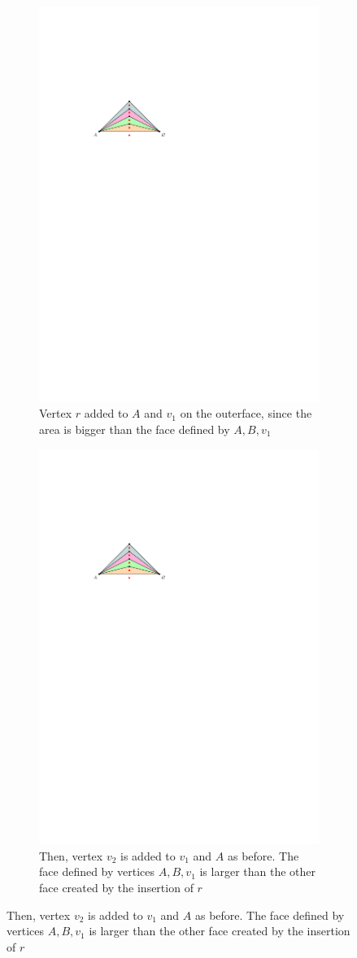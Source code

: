 \begin{figure}[H]
	\centering
	\begin{subfigure}{0.7\textwidth}
		\centering
		\includegraphics[width=.7\linewidth,page=15]{drawings/k-trees.pdf}
		\caption{Vertex $r$ added to $A$ and $v_1$ on the outerface, since the area is bigger than the face defined by $A,B,v_1$}
	\end{subfigure}
\begin{subfigure}{0.7\textwidth}
	\centering
	\includegraphics[width=.7\linewidth,page=16]{drawings/k-trees.pdf}
	\caption{Then, vertex $v_2$ is added to $v_1$ and $A$ as before. The face defined by vertices $A,B,v_1$ is larger than the other face created by the insertion of $r$}
\end{subfigure}


\end{figure}
